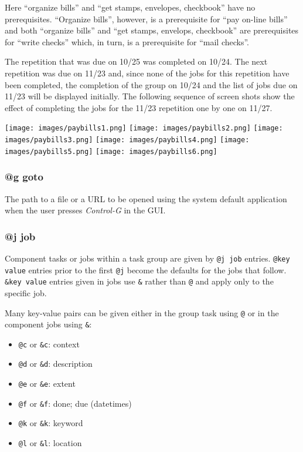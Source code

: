 \documentclass[]{article}
\makeatletter
\def\maxwidth{\ifdim\Gin@nat@width>\linewidth\linewidth
\else\Gin@nat@width\fi}
\let\Oldincludegraphics\includegraphics
\renewcommand{\includegraphics}[1]{\Oldincludegraphics[width=\maxwidth]{#1}}
\makeatother
\begin{document}
Here ``organize bills'' and ``get stamps, envelopes, checkbook'' have no
prerequisites. ``Organize bills'', however, is a prerequisite for ``pay
on-line bills'' and both ``organize bills'' and ``get stamps, envelops,
checkbook'' are prerequisites for ``write checks'' which, in turn, is a
prerequisite for ``mail checks''.

The repetition that was due on 10/25 was completed on 10/24. The next
repetition was due on 11/23 and, since none of the jobs for this
repetition have been completed, the completion of the group on 10/24 and
the list of jobs due on 11/23 will be displayed initially. The following
sequence of screen shots show the effect of completing the jobs for the
11/23 repetition one by one on 11/27.

\texttt{[image: images/paybills1.png]}
\texttt{[image: images/paybills2.png]}
\texttt{[image: images/paybills3.png]}
\texttt{[image: images/paybills4.png]}
\texttt{[image: images/paybills5.png]}
\texttt{[image: images/paybills6.png]}
\subsubsection{@g goto}

The path to a file or a URL to be opened using the system default
application when the user presses \emph{Control-G} in the GUI.

\subsubsection{@j job}

Component tasks or jobs within a task group are given by \texttt{@j job}
entries. \texttt{@key value} entries prior to the first \texttt{@j}
become the defaults for the jobs that follow. \texttt{\&key value}
entries given in jobs use \texttt{\&} rather than \texttt{@} and apply
only to the specific job.

Many key-value pairs can be given either in the group task using
\texttt{@} or in the component jobs using \texttt{\&}:

\begin{itemize}
\item
  \texttt{@c} or \texttt{\&c}: context
\item
  \texttt{@d} or \texttt{\&d}: description
\item
  \texttt{@e} or \texttt{\&e}: extent
\item
  \texttt{@f} or \texttt{\&f}: done; due (datetimes)
\item
  \texttt{@k} or \texttt{\&k}: keyword
\item
  \texttt{@l} or \texttt{\&l}: location
\end{itemize}
\end{document}
